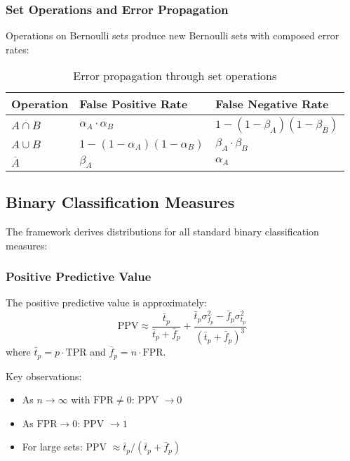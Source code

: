 \subsubsection{Set Operations and Error Propagation}

Operations on Bernoulli sets produce new Bernoulli sets with composed error rates:

\begin{table}[h]
\centering
\begin{tabular}{|l|l|l|}
\hline
\textbf{Operation} & \textbf{False Positive Rate} & \textbf{False Negative Rate} \\
\hline
$A \cap B$ & $\alpha_A \cdot \alpha_B$ & $1-(1-\beta_A)(1-\beta_B)$ \\
$A \cup B$ & $1-(1-\alpha_A)(1-\alpha_B)$ & $\beta_A \cdot \beta_B$ \\
$\overline{A}$ & $\beta_A$ & $\alpha_A$ \\
\hline
\end{tabular}
\caption{Error propagation through set operations}
\end{table}

\subsection{Binary Classification Measures}

The framework derives distributions for all standard binary classification measures:

\subsubsection{Positive Predictive Value}

\begin{theorem}
The positive predictive value is approximately:
\begin{equation}
\text{PPV} \approx \frac{\bar{t}_p}{\bar{t}_p + \bar{f}_p} + \frac{\bar{t}_p \sigma^2_{f_p} - \bar{f}_p \sigma^2_{t_p}}{(\bar{t}_p + \bar{f}_p)^3}
\end{equation}
where $\bar{t}_p = p \cdot \text{TPR}$ and $\bar{f}_p = n \cdot \text{FPR}$.
\end{theorem}

Key observations:
\begin{itemize}
\item As $n \to \infty$ with $\text{FPR} \neq 0$: PPV $\to 0$
\item As $\text{FPR} \to 0$: PPV $\to 1$
\item For large sets: PPV $\approx \bar{t}_p / (\bar{t}_p + \bar{f}_p)$
\end{itemize}

